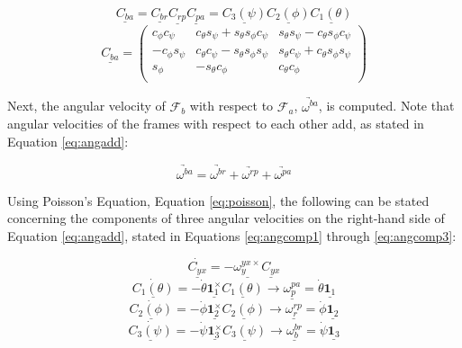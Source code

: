 \documentclass[journal]{IEEEtran}
\begin{document}
\begin{equation}
	\underline{C_{ba}}=\underline{C_{br}}\underline{C_{rp}}\underline{C_{pa}}=\underline{C_3{(\psi)}}\underline{C_2{(\phi)}}\underline{C_1{(\theta)}}
	\label{eq:dcmbase}
\end{equation}
\begin{equation}
	\underline{C_{ba}}=\left( \begin{array}{ccc}
	c_{\phi}c_{\psi} & c_{\theta}s_{\psi}+s_{\theta}s_{\phi}c_{\psi} & s_{\theta}s_{\psi}-c_{\theta}s_{\phi}c_{\psi} \\
	-c_{\phi}s_{\psi} & c_{\theta}c_{\psi}-s_{\theta}s_{\phi}s_{\psi} & s_{\theta}c_{\psi}+c_{\theta}s_{\phi}s_{\psi} \\
	s_{\phi} & -s_{\theta}c_{\phi} & c_{\theta}c_{\phi} \\
	\end{array} \right)
	\label{eq:dcm}
\end{equation}

Next, the angular velocity of $\mathcal{F}_b$ with respect to $\mathcal{F}_a$, $\underrightarrow{\omega^{ba}}$, is computed. Note that angular velocities of the frames with respect to each other add, as stated in Equation \ref{eq:angadd}:

\begin{equation}
	\underrightarrow{\omega^{ba}}=\underrightarrow{\omega^{br}}+\underrightarrow{\omega^{rp}}+\underrightarrow{\omega^{pa}}
	\label{eq:angadd}
\end{equation}

Using Poisson's Equation, Equation \ref{eq:poisson}, the following can be stated concerning the components of three angular velocities on the right-hand side of Equation \ref{eq:angadd}, stated in Equations \ref{eq:angcomp1} through \ref{eq:angcomp3}:

\begin{equation}
	\underline{\dot{C_{yx}}}=-\underline{\omega^{yx\times}_y}\underline{C_{yx}}
	\label{eq:poisson}
\end{equation}
\begin{equation}
	\underline{\dot{C_1(\theta)}}=-\dot{\theta}\underline{\mathbf{1}^{\times}_1}\underline{C_1(\theta)} \xrightarrow[]{} \underline{\omega^{pa}_p}=\dot{\theta}\underline{\mathbf{1}_1}
	\label{eq:angcomp1}
\end{equation}
\begin{equation}
	\underline{\dot{C_2(\phi)}}=-\dot{\phi}\underline{\mathbf{1}^{\times}_2}\underline{C_2(\phi)} \xrightarrow[]{} \underline{\omega^{rp}_r}=\dot{\phi}\underline{\mathbf{1}_2}
	\label{eq:angcomp2}
\end{equation}
\begin{equation}
	\underline{\dot{C_3(\psi)}}=-\dot{\psi}\underline{\mathbf{1}^{\times}_3}\underline{C_3(\psi)} \xrightarrow[]{} \underline{\omega^{br}_b}=\dot{\psi}\underline{\mathbf{1}_3}
	\label{eq:angcomp3}
\end{equation}
\end{document}
